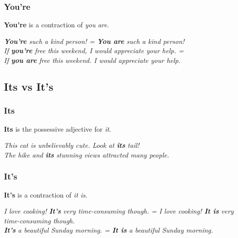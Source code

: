 \documentclass[hidelinks,10pt,a4paper]{article}
\begin{document}
\subsubsection{You're}
\textbf{You're} is a contraction of \textit{you are}.

\begin{center}
	\textit{\textbf{You're} such a kind person! = \textbf{You are} such a kind person!}\\
	\textit{If \textbf{you're} free this weekend, I would appreciate your help. =\\
	If \textbf{you are} free this weekend. I would appreciate your help.}
\end{center}

\subsection{Its vs It's}
\subsubsection{Its}
\textbf{Its} is the possessive adjective for \textit{it}.
\begin{center}
	\textit{This cat is unbelievably cute. Look at \textbf{its} tail!}\\
	\textit{The hike and \textbf{its} stunning views attracted many people.}
\end{center}

\subsubsection{It's}
\textbf{It's} is a contraction of \textit{it is}.
\begin{center}
	\textit{I love cooking! \textbf{It's} very time-consuming though. = I love cooking! \textbf{It is} very time-consuming though.}\\
	\textit{\textbf{It's} a beautiful Sunday morning. = \textbf{It is} a beautiful Sunday morning.}
\end{center}
\end{document}
